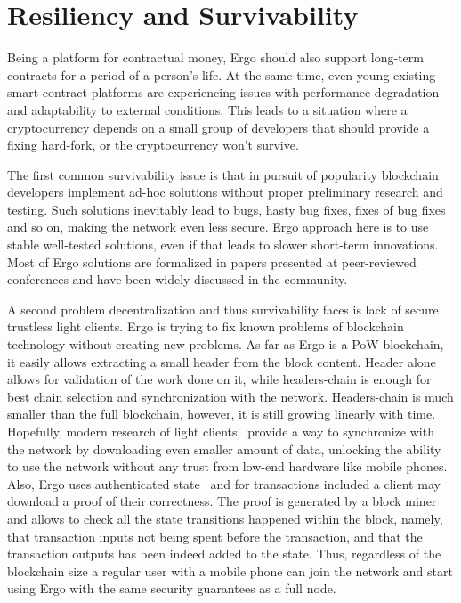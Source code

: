 \section{Resiliency and Survivability}
\label{sec:survivability}



Being a platform for contractual money, Ergo should also support long-term contracts for a
period of a person's life.
At the same time, even young existing smart contract platforms are experiencing issues with performance degradation and
adaptability to external conditions.
This leads to a situation where a cryptocurrency depends on a small group of developers
that should provide a fixing hard-fork, or the cryptocurrency won't survive.

The first common survivability issue is that in pursuit of popularity blockchain developers implement ad-hoc
solutions without proper preliminary research and testing.
Such solutions inevitably lead to bugs, hasty bug fixes, fixes of bug fixes and so on, making the network even less secure.
Ergo approach here is to use stable well-tested solutions, even if that leads to slower
short-term innovations.
Most of Ergo solutions are formalized in papers presented at peer-reviewed conferences
and have been widely discussed in the community.

A second problem decentralization and thus survivability faces is lack of secure trustless light clients.
Ergo is trying to fix known problems of blockchain technology without creating new problems.
As far as Ergo is a PoW blockchain, it easily allows extracting a small header from the block content.
Header alone allows for validation of the work done on it, while headers-chain is enough for best chain selection
and synchronization with the network.
Headers-chain is much smaller than the full blockchain, however, it is still growing linearly with time.
Hopefully, modern research of light clients~\cite{kiayias2017non,luuflyclient} provide a way to
synchronize with the network by downloading even smaller amount of data, unlocking the ability to
use the network without any trust from low-end hardware like mobile phones.
Also, Ergo uses authenticated state~\cite{reyzin2017improving} and for transactions included
a client may download a proof of their correctness.
The proof is generated by a block miner and allows to check all the state transitions happened within the block, namely,
that transaction inputs not being spent before the transaction, and that the
transaction outputs has been indeed added to the state.
Thus, regardless of the blockchain size a regular user with
a mobile phone can join the network and start using Ergo with the same security
guarantees as a full node. 

